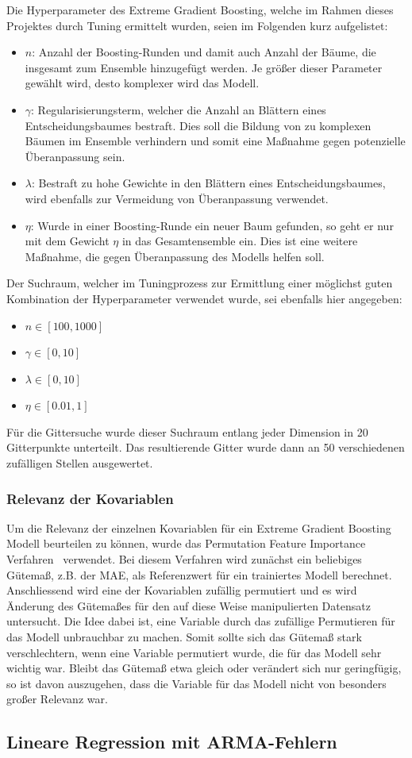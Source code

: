 Die Hyperparameter des Extreme Gradient Boosting, welche im Rahmen dieses Projektes durch Tuning
ermittelt wurden, seien im Folgenden kurz aufgelistet:
\begin{itemize}
    \item $n$: Anzahl der Boosting-Runden und damit auch Anzahl der B\"aume, die insgesamt zum Ensemble hinzugef\"ugt werden.
        Je gr\"o{\ss}er dieser Parameter gew\"ahlt wird, desto komplexer wird das Modell.
    \item $\gamma$: Regularisierungsterm, welcher die Anzahl an Bl\"attern eines Entscheidungsbaumes bestraft.
        Dies soll die Bildung von zu komplexen B\"aumen im Ensemble verhindern und somit eine Ma{\ss}nahme gegen potenzielle
        \"Uberanpassung sein.
    \item $\lambda$: Bestraft zu hohe Gewichte in den Bl\"attern eines Entscheidungsbaumes, wird ebenfalls zur Vermeidung von
        \"Uberanpassung verwendet.
    \item $\eta$: Wurde in einer Boosting-Runde ein neuer Baum gefunden, so geht er nur mit dem Gewicht $\eta$ in das 
        Gesamtensemble ein. Dies ist eine weitere Ma{\ss}nahme, die gegen \"Uberanpassung des Modells helfen soll.
\end{itemize}
Der Suchraum, welcher im Tuningprozess zur Ermittlung einer m\"oglichst guten Kombination der Hyperparameter verwendet wurde, 
sei ebenfalls hier angegeben:
\begin{itemize}
    \item $n \in \left[100, 1000 \right]$
    \item $\gamma \in \left[0, 10 \right]$
    \item $\lambda \in \left[0, 10 \right]$
    \item $\eta \in \left[0.01, 1 \right]$
\end{itemize}
F\"ur die Gittersuche wurde dieser Suchraum entlang jeder Dimension in 20 Gitterpunkte unterteilt. Das resultierende Gitter wurde
dann an 50 verschiedenen zuf\"alligen Stellen ausgewertet.

\subsubsection{Relevanz der Kovariablen}

Um die Relevanz der einzelnen Kovariablen f\"ur ein Extreme Gradient Boosting Modell beurteilen zu k\"onnen, wurde
das Permutation Feature Importance Verfahren~\cite{molnar2019} verwendet.
Bei diesem Verfahren wird zun\"achst ein beliebiges G\"utema{\ss}, z.B. der MAE, als Referenzwert f\"ur ein trainiertes Modell
berechnet. Anschliessend wird eine der Kovariablen zuf\"allig permutiert und es wird \"Anderung des G\"utema{\ss}es f\"ur den auf
diese Weise manipulierten Datensatz untersucht.
Die Idee dabei ist, eine Variable durch das zuf\"allige Permutieren f\"ur das Modell unbrauchbar zu machen.
Somit sollte sich das G\"utema{\ss} stark verschlechtern, wenn eine Variable permutiert wurde, die f\"ur das Modell sehr wichtig war.
Bleibt das G\"utema{\ss} etwa gleich oder ver\"andert sich nur geringf\"ugig, so ist davon auszugehen, dass die Variable 
f\"ur das Modell nicht von besonders gro{\ss}er Relevanz war.

\subsection{Lineare Regression mit ARMA-Fehlern}
\label{sec:arma}
